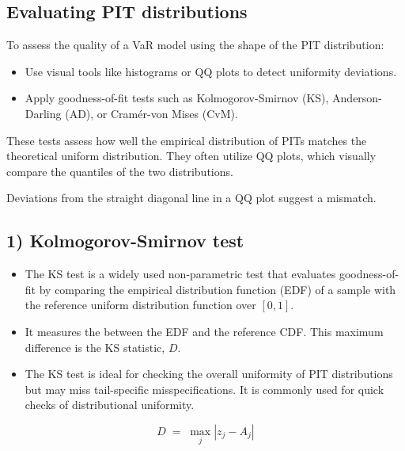 
\subsection{Evaluating PIT distributions}
To assess the quality of a VaR model using the shape of the PIT distribution:
\begin{itemize}
\item Use visual tools like histograms or QQ plots to detect uniformity deviations.
\item Apply goodness-of-fit tests such as Kolmogorov-Smirnov (KS), Anderson-Darling (AD), or
      Cram\'er-von Mises (CvM).
\end{itemize}

These tests assess how well the empirical distribution of PITs matches the theoretical uniform
distribution. They often utilize QQ plots, which visually compare the quantiles of the two
distributions.

\begin{mrtrapbox}[title={Remember}]
Deviations from the straight diagonal line in a QQ plot suggest a mismatch.
\end{mrtrapbox}

\subsection{1) Kolmogorov-Smirnov test}
\begin{itemize}
\item The KS test is a widely used non-parametric test that evaluates goodness-of-fit by
      comparing the empirical distribution function (EDF) of a sample with the reference uniform
      distribution function over $[0,1]$.
\item It measures the  between the EDF and the reference CDF. This
      maximum difference is the KS statistic, $D$.
\item The KS test is ideal for checking the overall uniformity of PIT distributions but may miss
      tail-specific misspecifications. It is commonly used for quick checks of distributional
      uniformity.
\end{itemize}

\begin{mrfmlbox}
\[ D \;=\; \max_j \left| z_j - A_j \right| \]
\end{mrfmlbox}

